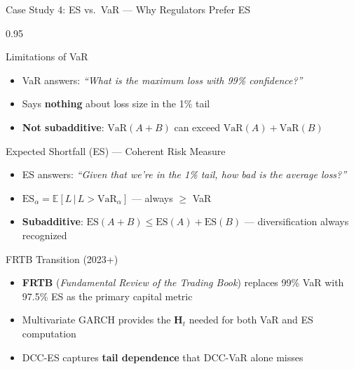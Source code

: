 \documentclass[9pt, aspectratio=169, t]{beamer}
\begin{document}
\begin{frame}{Case Study 4: ES vs.\ VaR --- Why Regulators Prefer ES}
    \begin{cminipage}{0.95\textwidth}
    \vspace{-2mm}
    {\footnotesize
    \begin{block}{Limitations of VaR}
        \begin{itemize}\setlength{\itemsep}{0pt}
            \item VaR answers: \textit{``What is the maximum loss with 99\% confidence?''}
            \item Says \textbf{nothing} about loss size in the 1\% tail
            \item \textbf{Not subadditive}: $\text{VaR}(A+B)$ can exceed $\text{VaR}(A) + \text{VaR}(B)$
        \end{itemize}
    \end{block}
    \vspace{-2mm}
    \begin{block}{Expected Shortfall (ES) --- Coherent Risk Measure}
        \begin{itemize}\setlength{\itemsep}{0pt}
            \item ES answers: \textit{``Given that we're in the 1\% tail, how bad is the average loss?''}
            \item $\text{ES}_\alpha = \mathbb{E}[L \,|\, L > \text{VaR}_\alpha]$ --- always $\geq$ VaR
            \item \textbf{Subadditive}: $\text{ES}(A+B) \leq \text{ES}(A) + \text{ES}(B)$ --- diversification always recognized
        \end{itemize}
    \end{block}
    \vspace{-2mm}
    \begin{alertblock}{FRTB Transition (2023+)}
        \begin{itemize}\setlength{\itemsep}{0pt}
            \item \textbf{FRTB} (\textit{Fundamental Review of the Trading Book}) replaces 99\% VaR with 97.5\% ES as the primary capital metric
            \item Multivariate GARCH provides the $\mathbf{H}_t$ needed for both VaR and ES computation
            \item DCC-ES captures \textbf{tail dependence} that DCC-VaR alone misses
        \end{itemize}
    \end{alertblock}
    }
    \end{cminipage}
\end{frame}
\end{document}
